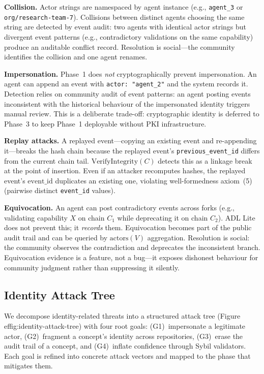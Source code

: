 \textbf{Collision.} Actor strings are namespaced by agent instance (e.g., \texttt{agent\_3} or \texttt{org/research-team-7}). Collisions between distinct agents choosing the same string are detected by event audit: two agents with identical actor strings but divergent event patterns (e.g., contradictory validations on the same capability) produce an auditable conflict record. Resolution is social---the community identifies the collision and one agent renames.

\textbf{Impersonation.} Phase~1 does \emph{not} cryptographically prevent impersonation. An agent can append an event with \texttt{actor: "agent\_2"} and the system records it. Detection relies on community audit of event patterns: an agent posting events inconsistent with the historical behaviour of the impersonated identity triggers manual review. This is a deliberate trade-off: cryptographic identity is deferred to Phase~3 to keep Phase~1 deployable without PKI infrastructure.

\textbf{Replay attacks.} A replayed event---copying an existing event and re-appending it---breaks the hash chain because the replayed event's \texttt{previous\_event\_id} differs from the current chain tail. $\text{VerifyIntegrity}(C)$ detects this as a linkage break at the point of insertion. Even if an attacker recomputes hashes, the replayed event's $\text{event\_id}$ duplicates an existing one, violating well-formedness axiom~(5) (pairwise distinct \texttt{event\_id} values).

\textbf{Equivocation.} An agent can post contradictory events across forks (e.g., validating capability $X$ on chain $C_1$ while deprecating it on chain $C_2$). ADL Lite does not prevent this; it \emph{records} them. Equivocation becomes part of the public audit trail and can be queried by $\text{actors}(V)$ aggregation. Resolution is social: the community observes the contradiction and deprecates the inconsistent branch. Equivocation evidence is a feature, not a bug---it exposes dishonest behaviour for community judgment rather than suppressing it silently.

\subsection{Identity Attack Tree}

We decompose identity-related threats into a structured attack tree (Figure~
ef{fig:identity-attack-tree}) with four root goals: (G1)~impersonate a legitimate actor, (G2)~fragment a concept's identity across repositories, (G3)~erase the audit trail of a concept, and (G4)~inflate confidence through Sybil validators. Each goal is refined into concrete attack vectors and mapped to the phase that mitigates them.

